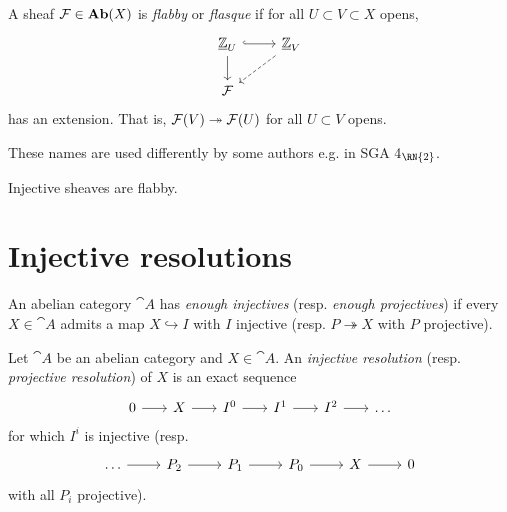 \documentclass[../main.tex]{subfiles}
\begin{document}
\begin{defn}
    A sheaf $\mathcal F \in \mathbf{Ab}(X)$ is \emph{flabby} or \emph{flasque} if for all $U\subset V\subset X$ opens,
    \[\begin{tikzcd}
    	{\underline{\bb Z}_U} & {\underline{\bb Z}_V} \\
    	{\sh F}
    	\arrow[hook, from=1-1, to=1-2]
    	\arrow[from=1-1, to=2-1]
    	\arrow[dashed, from=1-2, to=2-1]
    \end{tikzcd}\]
    has an extension. That is, $\mathcal{F}(V) \twoheadrightarrow \mathcal F(U)$ for all $U\subset V$ opens. 
\end{defn}

\begin{rmk}
    These names are used differently by some authors e.g. in SGA 4$_{\RN{2}}$.
\end{rmk}

\begin{exmp}
    Injective sheaves are flabby.
\end{exmp}

\section{Injective resolutions}


\begin{defn}
    An abelian category $\cat A$ has \emph{enough injectives} (resp. \emph{enough projectives}) if every $X\in \cat A$ admits a map $X\hookrightarrow I$ with $I$ injective (resp. $P\twoheadrightarrow X$ with $P$ projective).
\end{defn}

\begin{defn}
    Let $\cat A$ be an abelian category and $X\in \cat A$. An \emph{injective resolution}  (resp. \emph{projective resolution}) of $X$ is an exact sequence
    \[\begin{tikzcd}[column sep=scriptsize]
        0 \ar[r] & X \ar[r] & I^0 \ar[r] & I^1\ar[r] & I^2 \ar[r] & \dots
    \end{tikzcd}\]
    for which $I^i$ is injective (resp.
    \[\begin{tikzcd}
        \dots \ar[r] & P_2 \ar[r] & P_1 \ar[r] & P_0 \ar[r] & X \ar[r] & 0
    \end{tikzcd}\]
    with all $P_i$ projective).
\end{defn}
\end{document}
